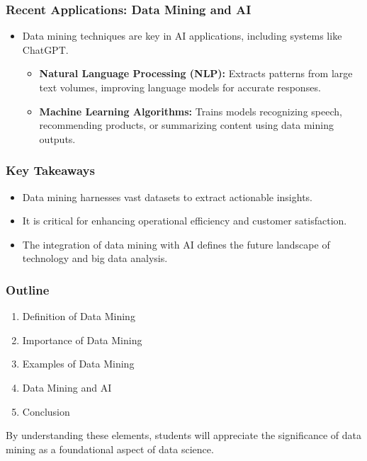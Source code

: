 \documentclass[aspectratio=169]{beamer}
\begin{document}
\begin{frame}[fragile]
    \frametitle{Recent Applications: Data Mining and AI}

    \begin{itemize}
        \item Data mining techniques are key in AI applications, including systems like ChatGPT.
        \begin{itemize}
            \item \textbf{Natural Language Processing (NLP):} Extracts patterns from large text volumes, improving language models for accurate responses.
            \item \textbf{Machine Learning Algorithms:} Trains models recognizing speech, recommending products, or summarizing content using data mining outputs.
        \end{itemize}
    \end{itemize}
\end{frame}

\begin{frame}[fragile]
    \frametitle{Key Takeaways}

    \begin{itemize}
        \item Data mining harnesses vast datasets to extract actionable insights.
        \item It is critical for enhancing operational efficiency and customer satisfaction.
        \item The integration of data mining with AI defines the future landscape of technology and big data analysis.
    \end{itemize}
\end{frame}

\begin{frame}[fragile]
    \frametitle{Outline}

    \begin{enumerate}
        \item Definition of Data Mining
        \item Importance of Data Mining
        \item Examples of Data Mining
        \item Data Mining and AI
        \item Conclusion
    \end{enumerate}

    By understanding these elements, students will appreciate the significance of data mining as a foundational aspect of data science.
\end{frame}
\end{document}
